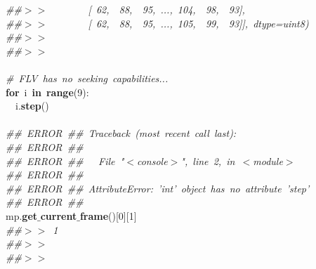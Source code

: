 \mbox{}\textit{\#\#$>$$>$\ \ \ \ \ \ \ \ [\ 62,\ \ 88,\ \ 95,\ ...,\ 104,\ \ 98,\ \ 93],} \\
\mbox{}\textit{\#\#$>$$>$\ \ \ \ \ \ \ \ [\ 62,\ \ 88,\ \ 95,\ ...,\ 105,\ \ 99,\ \ 93]],\ dtype=uint8)} \\
\mbox{}\textit{\#\#$>$$>$\ } \\
\mbox{}\textit{\#\#$>$$>$\ } \\
\mbox{} \\
\mbox{}\textit{\#\ FLV\ has\ no\ seeking\ capabilities...} \\
\mbox{}\textbf{for}\ i\ \textbf{in}\ \textbf{range}(9): \\
\mbox{}\ \ i.\textbf{step}() \\
\mbox{} \\
\mbox{}\textit{\#\#\ ERROR\ \#\#\ Traceback\ (most\ recent\ call\ last):} \\
\mbox{}\textit{\#\#\ ERROR\ \#\#\ } \\
\mbox{}\textit{\#\#\ ERROR\ \#\#\ \ \ File\ "{}$<$console$>$"{},\ line\ 2,\ in\ $<$module$>$} \\
\mbox{}\textit{\#\#\ ERROR\ \#\#\ } \\
\mbox{}\textit{\#\#\ ERROR\ \#\#\ AttributeError:\ 'int'\ object\ has\ no\ attribute\ 'step'} \\
\mbox{}\textit{\#\#\ ERROR\ \#\#\ } \\
\mbox{}mp.\textbf{get$\_$current$\_$frame}()[0][1] \\
\mbox{}\textit{\#\#$>$$>$\ 1} \\
\mbox{}\textit{\#\#$>$$>$\ } \\
\mbox{}\textit{\#\#$>$$>$\ } \\
\mbox{} \\
\mbox{}